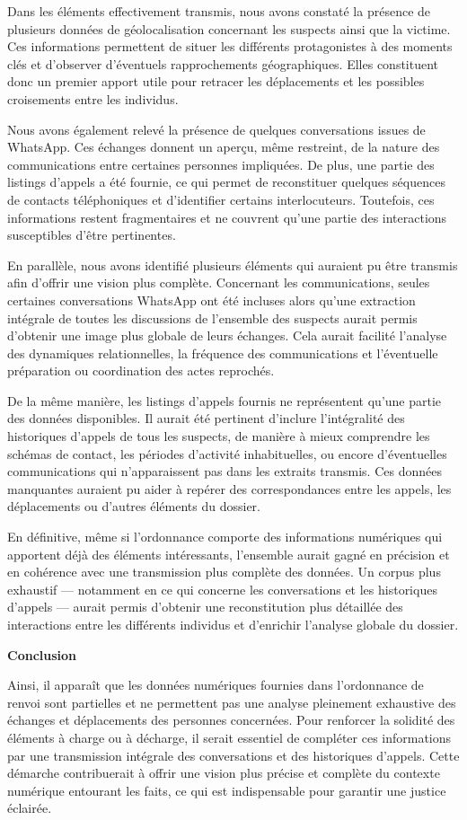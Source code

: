 \documentclass[12pt,a4paper]{report}
\begin{document}
Dans les éléments effectivement transmis, nous avons constaté la présence de plusieurs données de géolocalisation concernant les suspects ainsi que la victime. Ces informations permettent de situer les différents protagonistes à des moments clés et d’observer d’éventuels rapprochements géographiques. Elles constituent donc un premier apport utile pour retracer les déplacements et les possibles croisements entre les individus.

Nous avons également relevé la présence de quelques conversations issues de WhatsApp. Ces échanges donnent un aperçu, même restreint, de la nature des communications entre certaines personnes impliquées. De plus, une partie des listings d’appels a été fournie, ce qui permet de reconstituer quelques séquences de contacts téléphoniques et d’identifier certains interlocuteurs. Toutefois, ces informations restent fragmentaires et ne couvrent qu’une partie des interactions susceptibles d’être pertinentes.

En parallèle, nous avons identifié plusieurs éléments qui auraient pu être transmis afin d’offrir une vision plus complète. Concernant les communications, seules certaines conversations WhatsApp ont été incluses alors qu’une extraction intégrale de toutes les discussions de l’ensemble des suspects aurait permis d’obtenir une image plus globale de leurs échanges. Cela aurait facilité l’analyse des dynamiques relationnelles, la fréquence des communications et l’éventuelle préparation ou coordination des actes reprochés.

De la même manière, les listings d’appels fournis ne représentent qu’une partie des données disponibles. Il aurait été pertinent d’inclure l’intégralité des historiques d’appels de tous les suspects, de manière à mieux comprendre les schémas de contact, les périodes d’activité inhabituelles, ou encore d’éventuelles communications qui n’apparaissent pas dans les extraits transmis. Ces données manquantes auraient pu aider à repérer des correspondances entre les appels, les déplacements ou d’autres éléments du dossier.

En définitive, même si l’ordonnance comporte des informations numériques qui apportent déjà des éléments intéressants, l’ensemble aurait gagné en précision et en cohérence avec une transmission plus complète des données. Un corpus plus exhaustif — notamment en ce qui concerne les conversations et les historiques d’appels — aurait permis d’obtenir une reconstitution plus détaillée des interactions entre les différents individus et d’enrichir l’analyse globale du dossier.

\bigskip

\textbf{Conclusion}

Ainsi, il apparaît que les données numériques fournies dans l’ordonnance de renvoi sont partielles et ne permettent pas une analyse pleinement exhaustive des échanges et déplacements des personnes concernées. Pour renforcer la solidité des éléments à charge ou à décharge, il serait essentiel de compléter ces informations par une transmission intégrale des conversations et des historiques d’appels. Cette démarche contribuerait à offrir une vision plus précise et complète du contexte numérique entourant les faits, ce qui est indispensable pour garantir une justice éclairée.
\end{document}
